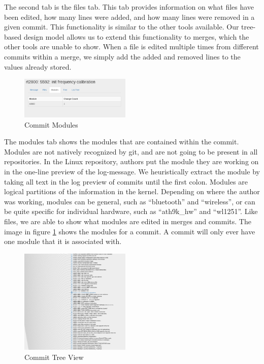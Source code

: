 \documentclass[conference, draftclsnofoot]{IEEEtran}
\begin{document}
The second tab is the files tab. This tab provides information on what files
have been edited, how many lines were added, and how many lines were removed in
a given commit. This functionality is similar to the other tools available. Our
tree-based design model allows us to extend this functionality to merges, which
the other tools are unable to show. When a file is edited multiple times from
different commits within a merge, we simply add the added and removed lines to
the values already stored.\newpage

\begin{figure}[h]
	\centering
	\includegraphics[width=0.47\textwidth]{figures/modules.png}
	\caption{Commit Modules}
	\label{fig:modules}
\end{figure}

The modules tab shows the modules that are contained within the commit. Modules
are not natively recognized by git, and are not going to be present in all
repositories. In the Linux repository, authors put the module they are working
on in the one-line preview of the log-message. We heuristically extract the
module by taking all text in the log preview of commits until the first colon.
Modules are logical partitions of the information in the kernel. Depending on
where the author was working, modules can be general, such as ``bluetooth'' and
``wireless'', or can be quite specific for individual hardware, such as
``ath9k\_hw'' and ``wl1251''. Like files, we are able to show what modules are
edited in merges and commits. The image in figure \ref{fig:modules} shows
the modules for a commit. A commit will only ever have one module that it is
associated with.

\begin{figure}[h]
	\centering
	\includegraphics[width=0.47\textwidth]{figures/tree_view.png}
	\caption{Commit Tree View}
	\label{fig:tree}
\end{figure}
\end{document}
